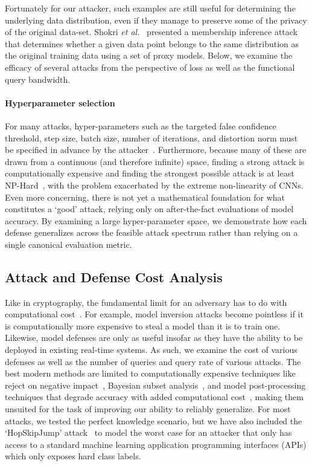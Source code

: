 \documentclass[lettersize,journal]{IEEEtran}
\begin{document}
Fortunately for our attacker, such examples are still useful for determining the underlying data distribution, even if they manage to preserve some of the privacy of the original data-set. Shokri \textit{et al.}~\cite{shokri2017membership} presented a membership inference attack that determines whether a given data point belongs to the same distribution as the original training data using a set of proxy models.  Below, we examine the efficacy of several attacks from the perspective of loss as well as the functional query bandwidth.



\paragraph{Hyperparameter selection}

For many attacks, hyper-parameters such as the targeted false confidence threshold, step size, batch size, number of iterations, and distortion norm must be specified in advance by the attacker~\cite{carlini_towards_2017}. Furthermore, because many of these are drawn from a continuous (and therefore infinite) space, finding a strong attack is computationally expensive and finding the strongest possible attack is at least NP-Hard~\cite{carlini_towards_2017}, with the problem exacerbated by the extreme non-linearity of CNNs. Even more concerning, there is not yet a mathematical foundation for what constitutes a `good' attack, relying only on after-the-fact evaluations of model accuracy. By examining a large hyper-parameter space, we demonstrate how each defense generalizes across the feasible attack spectrum rather than relying on a single canonical evaluation metric.



\subsection{Attack and Defense Cost Analysis}

Like in cryptography, the fundamental limit for an adversary has to do with computational cost~\cite{hoffstein_pipher_silverman_2010}. For example, model inversion attacks become pointless if it is computationally more expensive to steal a model than it is to train one. Likewise, model defenses are only as useful insofar as they have the ability to be deployed in existing real-time systems. As such, we examine the cost of various defenses as well as the number of queries and query rate of various attacks. The best modern methods are limited to computationally expensive techniques like reject on negative impact~\cite{nelson2010behavior}, Bayesian subset analysis~\cite{bect_bayesian_2017}, and model post-processing techniques that degrade accuracy with added computational cost~\cite{athalye_obfuscated_2018, papernot, li_general_2016}, making them unsuited for the task of improving our ability to reliably generalize. For most attacks, we tested the perfect knowledge scenario, but we have also included the `HopSkipJump' attack~\cite{hopskipjump} to model the worst case for an attacker that only has access to a standard machine learning application programming interfaces (APIs) which only exposes hard class labels.
\end{document}
